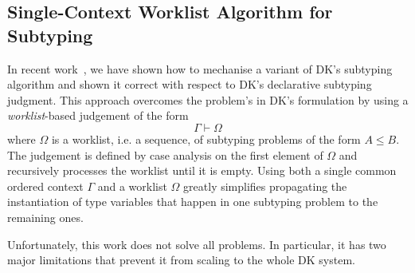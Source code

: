 % 
% 
% 
\subsection{Single-Context Worklist Algorithm for Subtyping}

In recent work~\cite{itp2018}, we have shown how to mechanise a variant of DK's
subtyping algorithm and shown it correct with respect to DK's declarative
subtyping judgment. This approach overcomes the problem's in DK's formulation
by using a \emph{worklist}-based judgement of the form $$\Gamma \vdash \Omega$$
where $\Omega$ is a worklist, i.e. a sequence, of subtyping problems of the
form $A \leq B$.  The judgement is defined by case analysis on the first
element of $\Omega$ and recursively processes the worklist until it is empty.
Using both a single common ordered context $\Gamma$ and a worklist $\Omega$ greatly
simplifies propagating the instantiation of type variables that happen in one
subtyping problem to the remaining ones.

Unfortunately, this work does not solve all problems. In particular, it has two
major limitations that prevent it from scaling to the whole DK system. 

